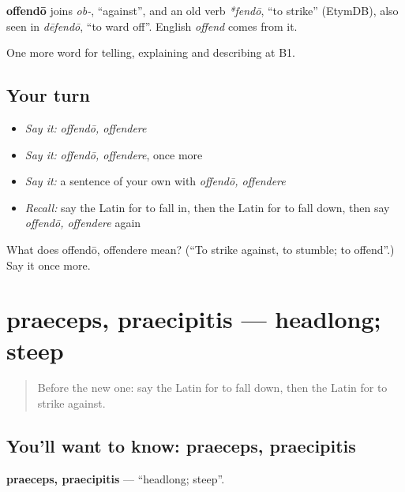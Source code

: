 \begin{cousinweb}
\textbf{offendō} joins \emph{ob-}, \textquotedblleft{}against\textquotedblright{}, and an old verb \emph{*fendō}, \textquotedblleft{}to strike\textquotedblright{} (EtymDB), also seen in \emph{dēfendō}, \textquotedblleft{}to ward off\textquotedblright{}. English \emph{offend} comes from it.
\end{cousinweb}

\begin{grammarlens}[title={What you've built}]
One more word for telling, explaining and describing at B1.
\end{grammarlens}

\subsection*{Your turn}
\begin{itemize}
\raggedright
  \item \emph{Say it:} \emph{offendō, offendere}
  \item \emph{Say it:} \emph{offendō, offendere}, once more
  \item \emph{Say it:} a sentence of your own with \emph{offendō, offendere}
  \item \emph{Recall:} say the Latin for to fall in, then the Latin for to fall down, then say \emph{offendō, offendere} again
\end{itemize}

\begin{tcolorbox}[breakable,colback=teal!4,colframe=teal!35!black,title={Before you move on}]
What does offendō, offendere mean? (\textquotedblleft{}To strike against, to stumble; to offend\textquotedblright{}.) Say it once more.
\end{tcolorbox}
\section[praeceps, praecipitis]{praeceps, praecipitis — headlong; steep}

\label{lesson:LA-C314-praeceps}



\begin{quote}
Before the new one: say the Latin for to fall down, then the Latin for to strike against.
\end{quote}

\subsection*{You'll want to know: praeceps, praecipitis}
\textbf{praeceps, praecipitis} — \textquotedblleft{}headlong; steep\textquotedblright{}.

